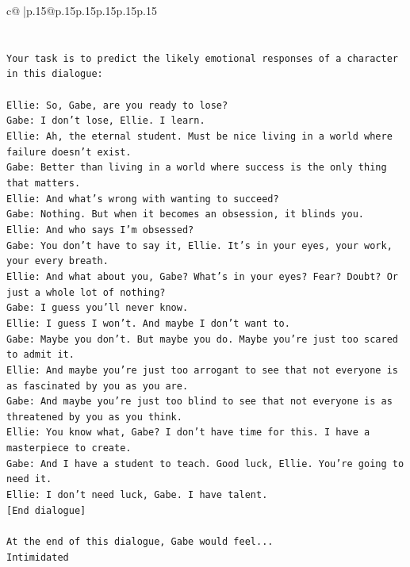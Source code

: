 \documentclass{article}
\begin{document}
{\begin{supertabular}{c@{$\;$}|p{.15\linewidth}@{}p{.15\linewidth}p{.15\linewidth}p{.15\linewidth}p{.15\linewidth}p{.15\linewidth}}
{{{\\ 
\\ 
\\ 
\texttt{Your task is to predict the likely emotional responses of a character in this dialogue:} \\
\\ 
\texttt{Ellie: So, Gabe, are you ready to lose?} \\
\texttt{Gabe: I don't lose, Ellie. I learn.} \\
\texttt{Ellie: Ah, the eternal student. Must be nice living in a world where failure doesn't exist.} \\
\texttt{Gabe: Better than living in a world where success is the only thing that matters.} \\
\texttt{Ellie: And what's wrong with wanting to succeed? } \\
\texttt{Gabe: Nothing. But when it becomes an obsession, it blinds you.} \\
\texttt{Ellie: And who says I'm obsessed?} \\
\texttt{Gabe: You don't have to say it, Ellie. It's in your eyes, your work, your every breath.} \\
\texttt{Ellie: And what about you, Gabe? What's in your eyes? Fear? Doubt? Or just a whole lot of nothing?} \\
\texttt{Gabe: I guess you'll never know.} \\
\texttt{Ellie: I guess I won't. And maybe I don't want to.} \\
\texttt{Gabe: Maybe you don't. But maybe you do. Maybe you're just too scared to admit it.} \\
\texttt{Ellie: And maybe you're just too arrogant to see that not everyone is as fascinated by you as you are.} \\
\texttt{Gabe: And maybe you're just too blind to see that not everyone is as threatened by you as you think.} \\
\texttt{Ellie: You know what, Gabe? I don't have time for this. I have a masterpiece to create.} \\
\texttt{Gabe: And I have a student to teach. Good luck, Ellie. You're going to need it.} \\
\texttt{Ellie: I don't need luck, Gabe. I have talent.} \\
\texttt{{[}End dialogue{]}} \\
\\ 
\texttt{At the end of this dialogue, Gabe would feel...} \\
\texttt{Intimidated} \\
}}}
\end{supertabular}}
\end{document}
